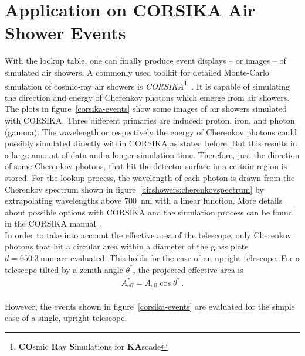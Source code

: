 \section{Application on CORSIKA Air Shower Events}

With the lookup table, one can finally produce event displays -- or images -- of simulated air showers. A commonly used toolkit for detailed Monte-Carlo simulation of cosmic-ray air showers is \textit{CORSIKA}\footnote{\textbf{CO}smic \textbf{R}ay \textbf{S}imulations for \textbf{KA}scade}~\cite{corsika:website}. It is capable of simulating the direction and energy of Cherenkov photons which emerge from air showers.\\

The plots in figure~\ref{corsika-events} show some images of air showers simulated with CORSIKA. Three different primaries are induced: proton, iron, and photon (gamma). The wavelength or respectively the energy of Cherenkov photons could possibly simulated directly within CORSIKA as stated before. But this results in a large amount of data and a longer simulation time. Therefore, just the direction of some Cherenkov photons, that hit the detector surface in a certain region is stored. For the lookup process, the wavelength of each photon is drawn from the Cherenkov spectrum shown in figure~\ref{airshowers:cherenkovspectrum} by extrapolating wavelengths above \SI{700}{\nano\meter} with a linear function. More details about possible options with CORSIKA and the simulation process can be found in the CORSIKA manual~\cite{corsika:manual}.\\

In order to take into account the effective area of the telescope, only Cherenkov photons that hit a circular area within a diameter of the glass plate $d=\SI{650.3}{\milli\meter}$ are evaluated. This holds for the case of an upright telescope. For a telescope tilted by a zenith angle $\theta^\ast$, the projected effective area is
\begin{align}
A_\text{eff}^\ast = A_\text{eff}\cos{\theta^\ast}\,.
\end{align}\\

However, the events shown in figure~\ref{corsika-events} are evaluated for the simple case of a single, upright telescope.

